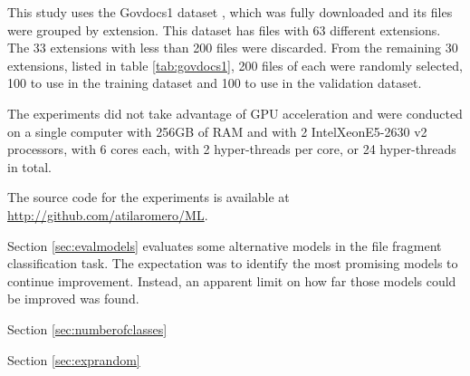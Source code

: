 This study uses the Govdocs1 dataset , which was fully downloaded and its files were grouped by extension. This dataset has files with 63 different extensions. The 33 extensions with less than 200 files were discarded. From the remaining 30 extensions, listed in table \ref{tab:govdocs1}, 200 files of each were randomly selected, 100 to use in the training dataset and 100 to use in the validation dataset.



The experiments did not take advantage of GPU acceleration and were  conducted on a single computer with 256GB of RAM and with 2 Intel\textregistered Xeon\textregistered E5-2630 v2 processors, with 6 cores each, with 2 hyper-threads per core, or 24 hyper-threads in total. 



The source code for the experiments is available at \url{http://github.com/atilaromero/ML}.

Section \ref{sec:evalmodels} evaluates some alternative models in the file fragment classification task. The expectation was to identify the most promising models to continue improvement. Instead, an apparent limit on how far those models could be improved was found. 

Section \ref{sec:numberofclasses} 

Section \ref{sec:exprandom} 












    
